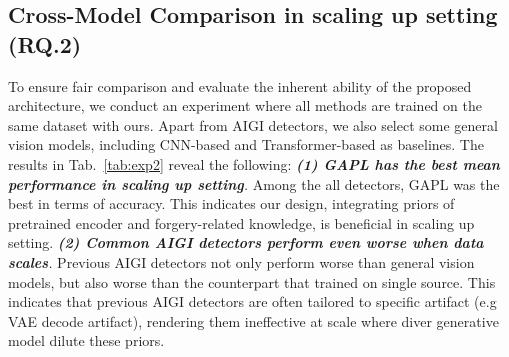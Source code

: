 \subsection{Cross-Model Comparison in scaling up setting (RQ.2)}
 To ensure fair comparison and evaluate the inherent ability of the proposed architecture, we conduct an experiment where all methods are trained on the same dataset with ours. Apart from AIGI detectors, we also select some general vision models, including CNN-based \cite{he2016deep, liu2022convnet} and Transformer-based \cite{CLIP, liu2021Swin} as baselines. The results in Tab.~\ref{tab:exp2} reveal the following:
 \textit{\textbf{(1) GAPL has the best mean performance in scaling up setting}.} Among the all detectors, GAPL was the best in terms of accuracy. This indicates our design, integrating priors of pretrained encoder and forgery-related knowledge, is beneficial in scaling up setting. \textit{\textbf{(2) Common AIGI detectors perform even worse when data scales}.} Previous AIGI detectors not only perform worse than general vision models, but also worse than the counterpart that trained on single source. This indicates that previous AIGI detectors are often tailored to specific artifact (e.g VAE decode artifact), rendering them ineffective at scale where diver generative model dilute these priors. 

 \begin{table}[t]
   \centering
        \caption{Ablation study regarding the designed modules. All the results reported are mean of the 4 benchmarks.}
    \label{tab:ablation}
\end{table}
   
